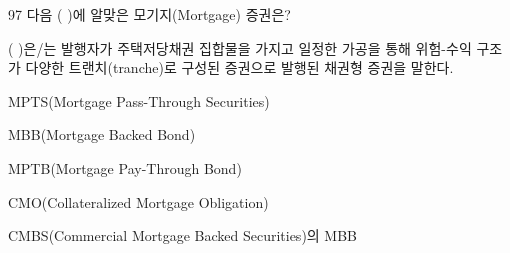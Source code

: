 \begin{question}{97}
다음 ( )에 알맞은 모기지(Mortgage) 증권은?
\begin{framedtext}
( )은/는 발행자가 주택저당채권 집합물을 가지고 일정한 가공을 통해 위험-수익 구조가 다양한 트랜치(tranche)로 구성된 증권으로 발행된 채권형 증권을 말한다. \par
\end{framedtext}
\begin{choices}
  \item MPTS(Mortgage Pass-Through Securities)
  \item MBB(Mortgage Backed Bond)
  \item MPTB(Mortgage Pay-Through Bond)
  \item CMO(Collateralized Mortgage Obligation)
  \item CMBS(Commercial Mortgage Backed Securities)의 MBB
\end{choices}
\end{question}

